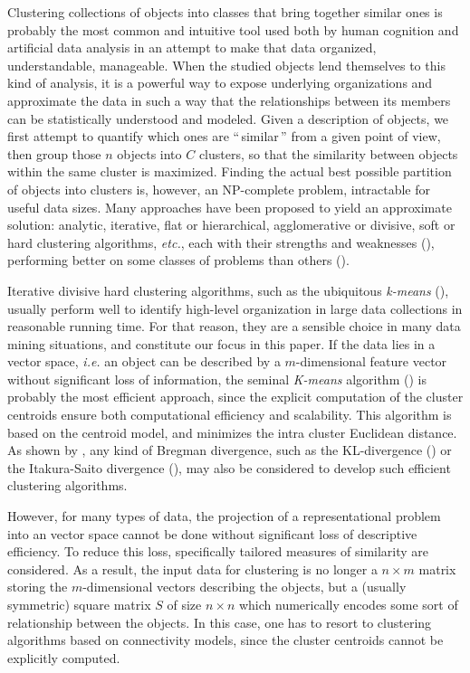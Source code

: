\documentclass[10pt,journal,compsoc]{IEEEtran}
\begin{document}
Clustering collections of objects into classes that bring together similar ones is probably the most common and intuitive tool used both by human cognition and artificial data analysis in an attempt to make that data organized, understandable, manageable. When the studied objects lend themselves to this kind of analysis, it is a powerful way to expose underlying organizations and approximate the data in such a way that the relationships between its members can be statistically understood and modeled. Given a description of objects, we first attempt to quantify which ones are ``\,similar\,'' from a given point of view, then group those $n$ objects into $C$ clusters, so that the similarity between objects within the same cluster is maximized. Finding the actual best possible partition of objects into clusters is, however, an NP-complete problem, intractable for useful data sizes. Many approaches have been proposed to yield an approximate solution: analytic, iterative, flat or hierarchical, agglomerative or divisive, soft or hard clustering algorithms, \textit{etc.}, each with their strengths and weaknesses (\cite{jain2010data}), performing better on some classes of problems than others (\cite{steinbach2000comparison,thalamuthu2006evaluation}).

Iterative divisive hard clustering algorithms, such as the ubiquitous \emph{k-means} (\cite{macQueenBsmsp67}), usually perform well to identify high-level organization in large data collections in reasonable running time. For that reason, they are a sensible choice in many data mining situations, and constitute our focus in this paper.
If the data lies in a vector space, \textit{i.e.} an object can be described by a $m$-dimensional feature vector without significant loss of information, the seminal \emph{K-means} algorithm (\cite{macQueenBsmsp67}) is probably the most efficient approach, since the explicit computation of the cluster centroids ensure both computational efficiency and scalability. This algorithm is  based on the centroid model, and minimizes the intra cluster Euclidean distance. As shown by \cite{Banerjee:2005:CBD:1046920.1194902}, any kind of Bregman divergence, such as the KL-divergence (\cite{Dhillon:2003:DIT:944919.944973}) or the Itakura-Saito divergence (\cite{linde:algorithm}), may also be considered to develop such efficient clustering algorithms.

However, for many types of data, the projection of a representational problem into an vector space cannot be done without significant loss of descriptive efficiency. To reduce this loss, specifically tailored measures of similarity are considered. As a result, the input data for clustering is no longer a $n \times m$ matrix storing the $m$-dimensional vectors describing the objects, but a (usually symmetric) square matrix $S$ of size $n \times n$ which numerically encodes some sort of relationship between the objects. In this case, one has to resort to clustering algorithms based on connectivity models, since the cluster centroids cannot be explicitly computed.
\end{document}

